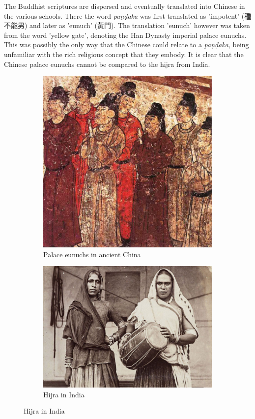 The Buddhist scriptures are dispersed and eventually translated into Chinese in the various schools. There the word {\em paṇḍaka} was first translated as 'impotent' (種不能男) and later as 'eunuch' (黃門). The translation 'eunuch' however was taken from the word 'yellow gate', denoting the Han Dynasty imperial palace eunuchs. This was possibly the only way that the Chinese could relate to a {\em paṇḍaka}, being unfamiliar with the rich religious concept that they embody. It is clear that the Chinese palace eunuchs cannot be compared to the hijra from India.

\begin{figure}[!tbp]
  \begin{subfigure}{0.4\textwidth}
    \includegraphics[width=\textwidth]{Eunuchs-in-ancient-China.jpg}
    \caption{Palace eunuchs in ancient China}
  \end{subfigure}
  \hfill
  \begin{subfigure}{0.4\textwidth}
    \includegraphics[width=\textwidth]{hijra.jpg}
    \caption{Hijra in India}
  \end{subfigure}
\end{figure}

